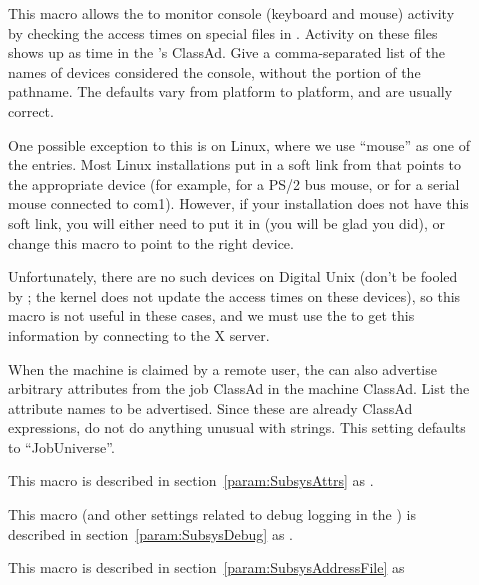 \begin{description}
\item[] \label{param:ConsoleDevices} This
  macro allows the  to monitor console (keyboard and mouse)
  activity by checking the access times on special files in
  .  Activity on these files shows up as 
  time in the 's ClassAd.  Give a comma-separated list of
  the names of devices considered the console, without the
   portion of the pathname.  The defaults vary from
  platform to platform, and are usually correct.  

  One possible exception to this is on Linux, where
  we use ``mouse'' as
  one of the entries.  Most Linux installations put in a
  soft link from  that points to the appropriate
  device (for example,  for a PS/2 bus mouse, or
   for a serial mouse connected to com1).  However,
  if your installation does not have this soft link, you will either
  need to put it in (you will be glad you did), or change this
  macro to point to the right device. 
  
  Unfortunately, there are no such devices on Digital Unix
  (don't be fooled by ; the kernel does not
  update the access times on these devices), so this macro is not
  useful in these cases, and we must use the  to get this
  information by connecting to the X server.
  
\item[] \label{param:StartdJobExprs} When
  the machine is claimed by a remote user, the  can also advertise
  arbitrary attributes from the job ClassAd in the machine
  ClassAd.
  List the attribute names to be advertised.  \Note Since
  these are already ClassAd expressions, do not do anything
  unusual with strings.   
  This setting defaults to ``JobUniverse''.

\item[] \label{param:StartdAttrs} This macro is
  described in section~\ref{param:SubsysAttrs} as
  .

\item[] \label{param:StartdDebug} This macro
  (and other settings related to debug logging in the ) is
  described in section~\ref{param:SubsysDebug} as
  .

\item[] \label{param:StartdAddressFile}
  This macro is described in
  section~\ref{param:SubsysAddressFile} as


\end{description}
